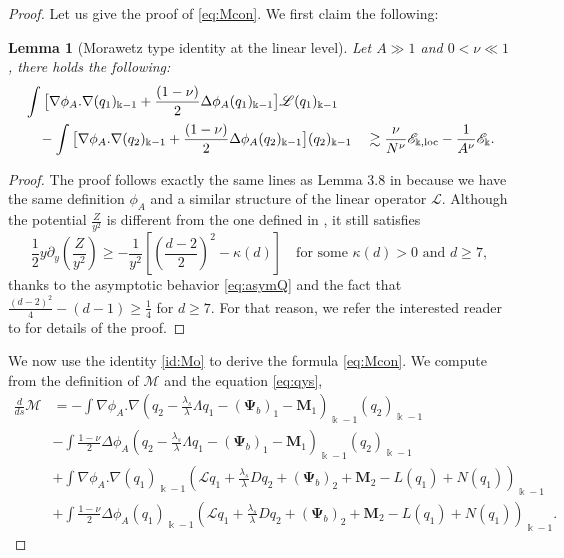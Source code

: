 \documentclass[11pt]{aims}
\newtheorem{lemma}[theorem]{Lemma}
\theoremstyle{definition}
\numberwithin{equation}{section}
\begin{document}
\begin{proof}
Let us give the proof of \eqref{eq:Mcon}. We first claim the following:
\begin{lemma}[Morawetz type identity at the linear level] Let $A \gg 1$ and $0 < \nu \ll 1$, there holds the following:
\begin{align}
&\int \big[\nabla \phi_A . \nabla (q_1)_{\Bbbk - 1} + \frac{(1 - \nu)}{2}\Delta \phi_A (q_1)_{\Bbbk- 1} \big]{\mathscr{L}} (q_1)_{\Bbbk - 1}\nonumber\\
& \quad - \int \big[\nabla \phi_A . \nabla (q_2)_{\Bbbk - 1} + \frac{(1 - \nu)}{2}\Delta \phi_A (q_2)_{\Bbbk- 1} \big](q_2)_{\Bbbk - 1} \quad \gtrsim  \frac{\nu}{N^\nu}{\mathscr{E}}_{\Bbbk, \textup{loc}} - \frac{1}{A^\nu}{\mathscr{E}}_\Bbbk.\label{id:Mo}
\end{align}
\end{lemma}
\begin{proof} The proof follows exactly the same lines as Lemma 3.8 in \cite{Car161} because we have the same definition $\phi_A$ and a similar structure of the linear operator ${\mathscr{L}}$. Although the potential $\frac{Z}{y^2}$ is different from the one defined in \cite{Car161}, it still satisfies
$$\frac{1}{2}y{\partial_y}\left(\frac{Z}{y^2}\right) \geq - \frac{1}{y^2}\left[\left(\frac{d-2}{2} \right)^2  - \kappa(d)\right] \quad \text{for some $\kappa(d) > 0$ and $d \geq 7$},$$
thanks to  the asymptotic behavior \eqref{eq:asymQ} and the fact that $\frac{(d-2)^2}{4} - (d-1) \geq \frac{1}{4}$ for $d \geq 7$. For that reason, we refer the interested reader to \cite{Car161} for details of the proof.
\end{proof}
We now use the identity \eqref{id:Mo} to derive the formula \eqref{eq:Mcon}. We compute from the definition of ${\mathcal{M}}$ and the equation \eqref{eq:qys}, 
\begin{align}
\frac{d}{ds}{\mathcal{M}} &= -\int \nabla \phi_A . \nabla \left( q_2 - \frac{\lambda_s}{\lambda}\Lambda q_1 - (\mathbf{\Psi}_b)_1 - \mathbf{M}_1 \right)_{\Bbbk - 1} (q_2)_{\Bbbk - 1} \nonumber\\
& -\int \frac{1 - \nu}{2}\Delta \phi_A \left( q_2 - \frac{\lambda_s}{\lambda}\Lambda q_1 - (\mathbf{\Psi}_b)_1 - \mathbf{M}_1 \right)_{\Bbbk - 1} (q_2)_{\Bbbk - 1}\nonumber\\
& + \int \nabla \phi_A . \nabla (q_1)_{\Bbbk - 1} \left({\mathscr{L}} q_1 + \frac{\lambda_s}{\lambda}D q_2 + (\mathbf{\Psi}_b)_2 + \mathbf{M}_2  - L(q_1) + N(q_1)\right)_{\Bbbk - 1}\nonumber\\
& +  \int \frac{1 - \nu}{2}\Delta \phi_A (q_1)_{\Bbbk - 1} \left({\mathscr{L}} q_1 + \frac{\lambda_s}{\lambda}D q_2 + (\mathbf{\Psi}_b)_2 + \mathbf{M}_2  - L(q_1) + N(q_1)\right)_{\Bbbk - 1}.\label{eq:IdM}

\end{align}
\end{proof}
\end{document}
